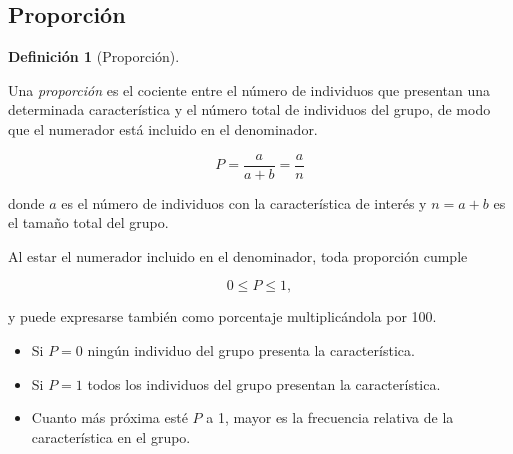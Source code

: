\documentclass[
  spanish,
  a4paper,
]{scrreport}
\providecommand{\tightlist}{%
  \setlength{\itemsep}{0pt}\setlength{\parskip}{0pt}}
\theoremstyle{definition}
\theoremstyle{definition}
\newtheorem{definition}{Definición}[chapter]
\theoremstyle{remark}
\begin{document}
\subsection{Proporción}\label{proporciuxf3n}

\begin{definition}[Proporción]\protect\hypertarget{def-descriptivos-proporcion}{}\label{def-descriptivos-proporcion}

Una \emph{proporción} es el cociente entre el número de individuos que
presentan una determinada característica y el número total de individuos
del grupo, de modo que el numerador está incluido en el denominador.

\[P = \frac{a}{a+b} = \frac{a}{n}\]

donde \(a\) es el número de individuos con la característica de interés
y \(n=a+b\) es el tamaño total del grupo.

\end{definition}

\begin{tcolorbox}[enhanced jigsaw, arc=.35mm, bottomrule=.15mm, bottomtitle=1mm, breakable, colback=white, colbacktitle=quarto-callout-important-color!10!white, colframe=quarto-callout-important-color-frame, coltitle=black, left=2mm, leftrule=.75mm, opacityback=0, opacitybacktitle=0.6, rightrule=.15mm, title=\textcolor{quarto-callout-important-color}{\faExclamation}\hspace{0.5em}{Importante}, titlerule=0mm, toprule=.15mm, toptitle=1mm]

Al estar el numerador incluido en el denominador, toda proporción cumple

\[0 \leq P \leq 1,\]

y puede expresarse también como porcentaje multiplicándola por 100.

\end{tcolorbox}

\begin{tcolorbox}[enhanced jigsaw, arc=.35mm, bottomrule=.15mm, bottomtitle=1mm, breakable, colback=white, colbacktitle=quarto-callout-note-color!10!white, colframe=quarto-callout-note-color-frame, coltitle=black, left=2mm, leftrule=.75mm, opacityback=0, opacitybacktitle=0.6, rightrule=.15mm, title=\textcolor{quarto-callout-note-color}{\faInfo}\hspace{0.5em}{Interpretación}, titlerule=0mm, toprule=.15mm, toptitle=1mm]

\begin{itemize}
\tightlist
\item
  Si \(P=0\) ningún individuo del grupo presenta la característica.
\item
  Si \(P=1\) todos los individuos del grupo presentan la característica.
\item
  Cuanto más próxima esté \(P\) a 1, mayor es la frecuencia relativa de
  la característica en el grupo.
\end{itemize}

\end{tcolorbox}
\end{document}
